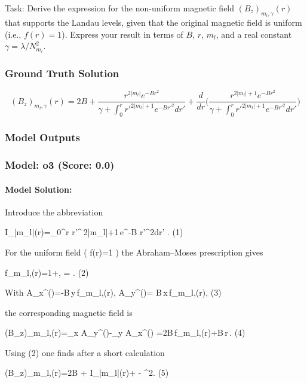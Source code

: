 \documentclass[10pt]{article}
\begin{document}
Task:
Derive the expression for the non-uniform magnetic field $(B_z)_{m_l,\gamma}(r)$ that supports the Landau levels, given that the original magnetic field is uniform (i.e., $f(r)=1$). Express your result in terms of $B$, $r$, $m_l$, and a real constant $\gamma = \lambda/N_{m_l}^2$.

\subsubsection*{Ground Truth Solution}
\[ \boxed{(B_z)_{m_l,\gamma}(r) = 2B + \frac{ r^{2|m_l|} e^{-B r^2}}{\gamma + \int_0^r {r'}^{2|m_l| + 1} e^{- B {r'}^2} dr'} + \frac{d}{dr} \bigg( \frac{ r^{2|m_l|+1} e^{-B r^2}}{\gamma + \int_0^r {r'}^{2|m_l| + 1} e^{- B {r'}^2} dr'} \bigg)} \]

\subsubsection*{Model Outputs}
\subsubsection*{Model: o3 (Score: 0.0)}
\paragraph*{Model Solution:}
Introduce the abbreviation  

I_{|m_l|}(r)=\int_{0}^{r} r'^{\,2|m_l|+1}\,e^{-B r'^{2}}\;dr' .      (1)

For the uniform field ( f(r)=1 ) the Abraham–Moses prescription gives  

f_{m_l,\lambda}(r)=1+\ln\!,\qquad  
\gamma=\; .                                            (2)

With  
A_x^{(\lambda)}=-B\,y\,f_{m_l,\lambda}(r),\qquad   
A_y^{(\lambda)}= B\,x\,f_{m_l,\lambda}(r),                                          (3)

the corresponding magnetic field is  

(B_z)_{m_l,\gamma}(r)=\partial_x A_y^{(\lambda)}-\partial_y A_x^{(\lambda)}
                     =2B\,f_{m_l,\lambda}(r)+B\,r\,.   (4)

Using (2) one finds after a short calculation

(B_z)_{m_l,\gamma}(r)=2B
      +
            {I_{|m_l|}(r)+\gamma}
      -
            {^{2}}\;.                           (5)
\end{document}
